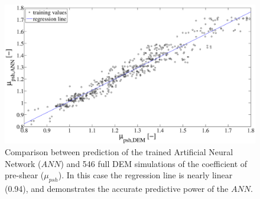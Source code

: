 \begin{figure}%
\centering 
\includegraphics[width=.96\columnwidth]{images/22regression.eps}
\caption[Comparison between prediction of the trained ANN and full DEM
simulation]{Comparison between prediction of the trained Artificial Neural
Network ($ANN$) and 546 full DEM simulations of the coefficient of pre-shear
($\mu_{psh}$). In this case the regression line is nearly linear (0.94), and
demonstrates the accurate predictive power of the $ANN$.}
\label{fig:22regression} 
\end{figure}